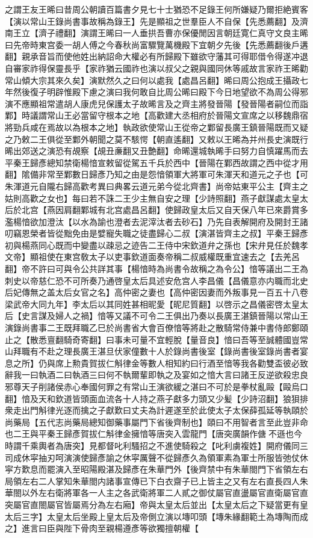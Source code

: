 之謂王友王晞曰昔周公朝讀百篇書夕見七十士猶恐不足錄王何所嫌疑乃爾拒絶賓客【演以常山王錄尚書事故稱為錄王】先是顯祖之世羣臣人不自保【先悉薦翻】及濟南王立【濟子禮翻】演謂王晞曰一人垂拱吾曹亦保優閒因言朝廷寛仁真守文良主晞曰先帝時東宫委一胡人傅之今春秋尚富驟覽萬機殿下宜朝夕先後【先悉薦翻後戶遘翻】親承音旨而使他姓出納詔命大權必有所歸殿下雖欲守藩其可得耶借令得遂冲退自審家祚得保靈長乎【家祚猶云國祚也演以叔父之親與國同休等戚故言家祚王晞勸常山傾大宗其來久矣】演默然久之曰何以處我【處昌呂翻】晞曰周公抱成王攝政七年然後復子明辟惟殿下慮之演曰我何敢自比周公晞曰殿下今日地望欲不為周公得邪演不應顯祖常遣胡人康虎兒保護太子故晞言及之齊主將發晉陽【發晉陽者嗣位而詣鄴】時議謂常山王必當留守根本之地【高歡建大丞相府於晉陽文宣席之以移魏鼎宿將勁兵咸在焉故以為根本之地】執政欲使常山王從帝之鄴留長廣王鎮晉陽既而又疑之乃敕二王俱從至鄴外朝聞之莫不駭愕【朝直遙翻】又敕以王晞為并州長史演既行晞出郊送之演恐有覘察【覘丑亷翻又丑艶翻】命晞還城執晞手曰努力自慎躍馬而去平秦王歸彥總知禁衛楊愔宣敕留從駕五千兵於西中【晉陽在鄴西故謂之西中從才用翻】隂備非常至鄴數日歸彥乃知之由是怨愔領軍大將軍可朱渾天和道元之子也【可朱渾道元自隴右歸高歡考異曰典畧云道元弟今從北齊書】尚帝姑東平公主【齊主之姑則高歡之女也】每曰若不誅二王少主無自安之理【少詩照翻】燕子獻謀處太皇太后於北宫【燕因肩翻鄴城有北宫處昌呂翻】使歸政皇太后又自天保八年已來爵賞多濫楊愔欲加澄汰【以水為諭也澄者去泥滓汰者去砂石】乃先自表解開府及開封王諸叨竊恩榮者皆從黜免由是嬖寵失職之徒盡歸心二叔【演湛皆齊主之叔】平秦王歸彥初與楊燕同心既而中變盡以疎忌之迹告二王侍中宋欽道弁之孫也【宋弁見任於魏孝文帝】顯祖使在東宫敎太子以吏事欽道面奏帝稱二叔威權既重宜速去之【去羌呂翻】帝不許曰可與令公共詳其事【楊愔時為尚書令故稱之為令公】愔等議出二王為刺史以帝慈仁恐不可所奏乃通啓皇太后具述安危宫人李昌儀【昌儀意亦内職而北史后妃傳無之盖太后女官之名】高仲密之妻也【高仲密因妻而外叛事見一百五十八卷梁武帝大同九年】李太后以其同姓甚相昵愛【昵尼質翻】以啓示之昌儀密啓太皇太后【史言謀及婦人之禍】愔等又議不可令二王俱出乃奏以長廣王湛鎮晉陽以常山王演錄尚書事二王既拜職乙巳於尚書省大會百僚愔等將赴之散騎常侍兼中書侍郎鄭頤止之【散悉亶翻騎奇寄翻】曰事未可量不宜輕脫【量音良】愔曰吾等至誠體國豈常山拜職有不赴之理長廣王湛旦伏家僮數十人於錄尚書後室【錄尚書後室錄尚書者宴息之所】仍與席上勲貴賀拔仁斛律金等數人相知約曰行酒至愔等我各勸雙盃彼必致辭我一曰執酒二曰執酒三曰何不執爾輩即執之及宴如之愔大言曰諸王反逆欲殺忠良邪尊天子削諸侯赤心奉國何罪之有常山王演欲緩之湛曰不可於是拳杖亂毆【毆烏口翻】愔及天和欽道皆頭面血流各十人持之燕子獻多力頭又少髪【少詩沼翻】狼狽排衆走出門斛律光逐而擒之子獻歎曰丈夫為計遲遂至於此使太子太保薛孤延等執頤於尚藥局【五代志尚藥局總知御藥事屬門下省後齊制也】頤曰不用智者言至此豈非命也二王與平秦王歸彥賀拔仁斛律金擁愔等唐突入雲龍門【唐突廣韻作傏不遜也今時謂千乘輿者為唐突】見都督叱利騷招之不進使騎殺之【叱利虜複姓】開府儀同三司成休寜抽刃呵演演使歸彥諭之休寜厲聲不從歸彥久為領軍素為軍士所服皆弛仗休寜方歎息而罷演入至昭陽殿湛及歸彥在朱華門外【後齊禁中有朱華閤門下省領左右局領左右二人掌知朱華閤内諸事宣傳已下白衣齋子已上皆主之又有左右直長四人朱華閤以外左右衛將軍各一人主之各武衛將軍二人貳之御仗屬官直盪屬官直衛屬官直突屬官直閤屬官皆屬焉分為左右廂】帝與太皇太后並出【太皇太后之下疑當更有皇太后三字】太皇太后坐殿上皇太后及帝側立演以塼叩頭【塼朱緣翻範土為塼陶而成之】進言曰臣與陛下骨肉至親楊遵彥等欲獨擅朝權【